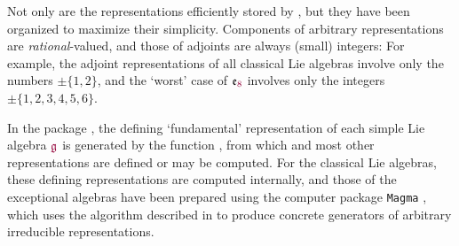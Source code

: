 \documentclass[12pt,a4paper]{article}\let\ifpdf\relax
\begin{document}
Not only are the representations efficiently stored by \rpackage, but they have been organized to maximize their simplicity. Components of arbitrary representations are \emph{rational}-valued, and those of adjoints are always (small) integers: For example, the adjoint representations of all classical Lie algebras involve only the numbers $\pm\!\{1,2\}$, and the `worst' case of $\mathfrak{e}_{\r{8}}$ involves only the integers $\pm\!\{1,2,3,4,5,6\}$.\\[-12pt]
%




In the package \rpackage, the defining `fundamental' representation of each simple Lie algebra $\mathfrak{\r{g}}$ is generated by the function , from which \mbox{} and most other representations are defined or may be computed. For the classical Lie algebras, these defining representations are computed internally, and those of the exceptional algebras have been prepared using the computer package \texttt{Magma} \cite{magma}, which uses the algorithm described in \cite{Magma_algorithm} to produce concrete generators of arbitrary irreducible representations.\\[-10pt]
\end{document}
